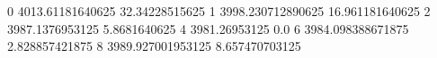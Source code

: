 0 4013.61181640625 32.34228515625
1 3998.230712890625 16.961181640625
2 3987.1376953125 5.8681640625
4 3981.26953125 0.0
6 3984.098388671875 2.828857421875
8 3989.927001953125 8.657470703125
